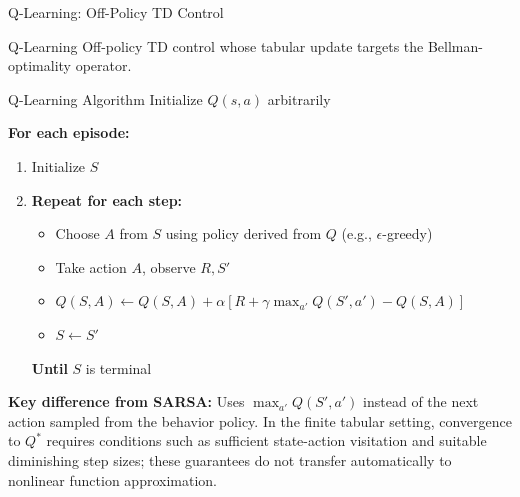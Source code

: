 \documentclass[aspectratio=169]{beamer}
\begin{document}
\begin{frame}{Q-Learning: Off-Policy TD Control}
  \begin{definitionbox}{Q-Learning}
    Off-policy TD control whose tabular update targets the Bellman-optimality operator.
  \end{definitionbox}

  \vspace{0.5em}

  \begin{examplebox}{Q-Learning Algorithm}
    Initialize $Q(s,a)$ arbitrarily

    \textbf{For each episode:}
    \begin{enumerate}
      \item Initialize $S$
      \item \textbf{Repeat for each step:}
      \begin{itemize}
        \item Choose $A$ from $S$ using policy derived from $Q$ (e.g., $\epsilon$-greedy)
        \item Take action $A$, observe $R, S'$
        \item $Q(S,A) \leftarrow Q(S,A) + \alpha[R + \gamma \max_{a'} Q(S',a') - Q(S,A)]$
        \item $S \leftarrow S'$
      \end{itemize}
      \textbf{Until} $S$ is terminal
    \end{enumerate}
  \end{examplebox}

  \vspace{0.5em}

  \textbf{Key difference from SARSA:} Uses $\max_{a'} Q(S',a')$ instead of the next action sampled from the behavior policy. In the finite tabular setting, convergence to $Q^*$ requires conditions such as sufficient state-action visitation and suitable diminishing step sizes; these guarantees do not transfer automatically to nonlinear function approximation.
\end{frame}
\end{document}

